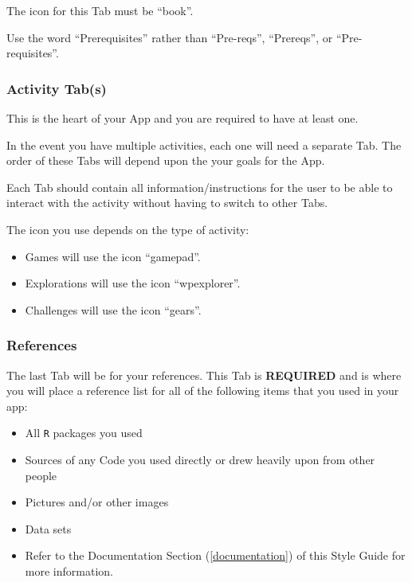 \documentclass[]{book}
\providecommand{\tightlist}{%
  \setlength{\itemsep}{0pt}\setlength{\parskip}{0pt}}
\begin{document}
The icon for this Tab must be ``book''.

Use the word ``Prerequisites'' rather than ``Pre-reqs'', ``Prereqs'', or ``Pre-requisites''.

\hypertarget{activity-tabs}{%
\subsubsection{Activity Tab(s)}\label{activity-tabs}}

This is the heart of your App and you are required to have at least one.

In the event you have multiple activities, each one will need a separate Tab. The order of these Tabs will depend upon the your goals for the App.

Each Tab should contain all information/instructions for the user to be able to interact with the activity without having to switch to other Tabs.

The icon you use depends on the type of activity:

\begin{itemize}
\tightlist
\item
  Games will use the icon ``gamepad''.
\item
  Explorations will use the icon ``wpexplorer''.
\item
  Challenges will use the icon ``gears''.
\end{itemize}

\hypertarget{references}{%
\subsubsection{References}\label{references}}

The last Tab will be for your references. This Tab is \textbf{REQUIRED} and is where you will place a reference list for all of the following items that you used in your app:

\begin{itemize}
\tightlist
\item
  All \texttt{R} packages you used
\item
  Sources of any Code you used directly or drew heavily upon from other people
\item
  Pictures and/or other images
\item
  Data sets
\item
  Refer to the Documentation Section (\ref{documentation}) of this Style Guide for more information.
\end{itemize}
\end{document}
